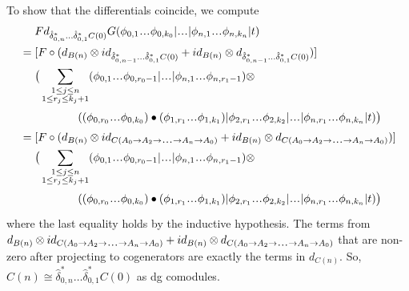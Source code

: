 \begin{eg}
To show that the differentials coincide, 
we compute 
\begin{align*}
& \phantom{{}={}}
Fd_{\hat{\delta}_{0,n}^*\dots\hat{\delta}_{0,1}^*C(0)}G
  (\phi_{0,1} \smdots \phi_{0,k_0} | \smdots |
  \phi_{n,1} \smdots \phi_{n,k_n} | t) \\
&=
[F \circ (d_{B(n)}\otimes 
  id_{\hat{\delta}_{0,n-1}^*\dots\hat{\delta}_{0,1}^*C(0)} + 
  id_{B(n)} \otimes 
  d_{\hat{\delta}_{0,n-1}^*\dots\hat{\delta}_{0,1}^*C(0)})] \\
& \phantom{{}=  {}}
\big( \sum \limits_{\substack{1 \leq j \leq n\\
  1 \leq r_j \leq k_j+1}}
  (\phi_{0,1} \smdots \phi_{0,r_0-1} | \smdots |
  \phi_{n,1} \smdots \phi_{n,r_1-1} ) \otimes \\
&\phantom{{}= \big( \sum \sum {}}
  ((\phi_{0,r_0}\smdots \phi_{0,k_0}) \bullet 
  (\phi_{1,r_1}\smdots \phi_{1,k_1}) |
  \phi_{2,r_1}\smdots \phi_{2,k_2} | \smdots |
  \phi_{n,r_1}\smdots \phi_{n,k_n} | t) \big) \\
&=
[F \circ (d_{B(n)}\otimes 
  id_{C(A_0 \to A_2 \to \smdots \to A_n \to A_0)} + 
  id_{B(n)} \otimes 
  d_{C(A_0 \to A_2 \to \smdots \to A_n \to A_0)})] \\
& \phantom{{}=  {}}
\big( \sum \limits_{\substack{1 \leq j \leq n\\
  1 \leq r_j \leq k_j+1}}
  (\phi_{0,1} \smdots \phi_{0,r_0-1} | \smdots |
  \phi_{n,1} \smdots \phi_{n,r_1-1}) \otimes \\
&\phantom{{}= \big( \sum \sum {}}
  ((\phi_{0,r_0}\smdots \phi_{0,k_0}) \bullet 
  (\phi_{1,r_1}\smdots \phi_{1,k_1}) |
  \phi_{2,r_1}\smdots \phi_{2,k_2} | \smdots |
  \phi_{n,r_1}\smdots \phi_{n,k_n} | t) \big)
\end{align*}
where the last equality holds by the 
inductive hypothesis. The terms from 
$d_{B(n)}\otimes id_{C(A_0 \to A_2 \to 
\smdots \to A_n \to A_0)} + 
id_{B(n)} \otimes d_{C(A_0 \to A_2 \to 
\smdots \to A_n \to A_0)}$ that
are non-zero after projecting to cogenerators 
are exactly the terms in $d_{C(n)}$. 
So, $C(n) \cong \hat{\delta}_{0,n}^*\dots
\hat{\delta}_{0,1}^*C(0)$ as dg comodules. 
\end{eg}
%
